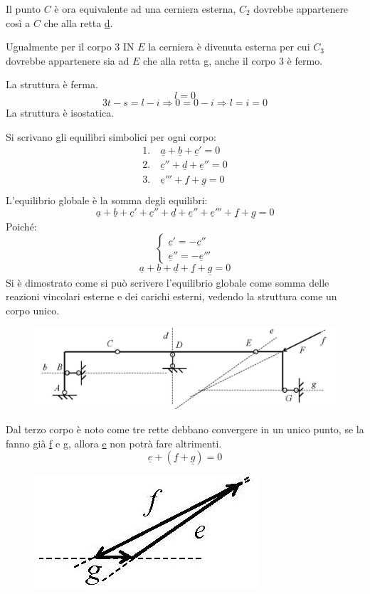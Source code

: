 \documentclass{article}
\begin{document}
\begin{adjustwidth}{2in}{}
Il punto $C$ è ora equivalente ad una cerniera esterna, $C_2$ dovrebbe appartenere così a $C$ che alla retta \underline{d}.

Ugualmente per il corpo 3 IN $E$ la cerniera è divenuta esterna per cui $C_3$ dovrebbe appartenere sia ad $E$ che alla retta \underline{g}, anche il corpo 3 è fermo. 

La struttura è ferma. 
\[l=0\]
\[3t - s = l- i \Rightarrow 0 = 0 - i \Rightarrow l=i=0\]
La struttura è isostatica. \newline 

Si scrivano gli equilibri simbolici per ogni corpo:
\[\begin{aligned}
	1. & ~ \underline{a} + \underline{b} + \underline{c}'   = 0 \\
	2. & ~ \underline{c}'' + \underline{d} + \underline{e}''  = 0 \\
	3. & ~ \underline{e}''' + \underline{f} + \underline{g}  = 0 \\
\end{aligned}\]
L'equilibrio globale è la somma degli equilibri:
\[ \underline{a} + \underline{b} + \underline{c}' + \underline{c}'' + \underline{d} + \underline{e}'' + \underline{e}''' + \underline{f} + \underline{g} = 0 \]
Poiché:
\[ \begin{cases}
	\underline{c}' = -\underline{c}'' \\
	\underline{e}'' = -\underline{e}''' \end{cases} \]
\[ \underline{a} + \underline{b}  + \underline{d}  + \underline{f} + \underline{g} = 0 \]
Si è dimostrato come si può scrivere l'equilibrio globale come somma delle reazioni vincolari esterne e dei carichi esterni, vedendo la struttura come un corpo unico. 

\begin{figure}[H]
	\centering
	\includegraphics[width=0.5\linewidth]{immagini/1.PARTE4_Pagina_30.1}
\end{figure}

Dal terzo corpo è noto come tre rette debbano convergere in un unico punto, se la fanno già \underline{f}  e \underline{g}, allora \underline{e} non potrà fare altrimenti. 
\[\underline{e} + (\underline{f} + \underline{g}) = 0\]

\begin{figure}[H]
	\centering
	\includegraphics[width=0.15\linewidth]{immagini/1.PARTE4_Pagina_30}
\end{figure}


\end{adjustwidth}
\end{document}
